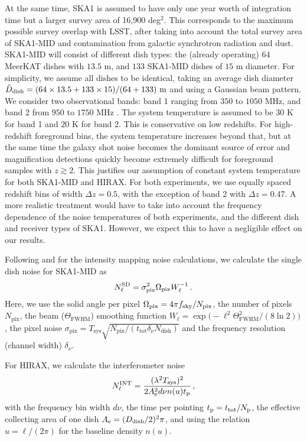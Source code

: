 \documentclass[useAMS,usenatbib]{mnras}
\begin{document}
At the same time, SKA1 is assumed to have only one year worth of integration time but a larger survey area of 16,900 deg${}^2$. This corresponds to the maximum possible survey overlap with LSST, after taking into account the total survey area of SKA1-MID \citep{2015aska.confE..19S} and contamination from galactic synchrotron radiation and dust. SKA1-MID will consist of different dish types: the (already operating) 64 MeerKAT dishes with $13.5$ m, and $133$ SKA1-MID dishes of $15$ m diameter. For simplicity, we assume all dishes to be identical, taking an average dish diameter $\tilde{D}_\mathrm{dish} = (64 \times 13.5 + 133 \times 15)/(64+133){\rm~m}$ and using a Gaussian beam pattern. We consider two observational bands: band 1 ranging from $350$ to $1050$ MHz, and band 2 from $950$ to $1750$ MHz \citep{Bacon:2018dui}. The system temperature is assumed to be  $30$ K for band 1 and $20$ K for band 2. This is conservative on low redshifts. For high-redshift foreground bins, the system temperature increases beyond that, but at the same time the galaxy shot noise becomes the dominant source of error and magnification detections quickly become extremely difficult for foreground samples with $z \gtrsim 2$. This justifies our assumption of constant system temperature for both SKA1-MID and HIRAX. For both experiments, we use equally spaced redshift bins of width $\Delta z = 0.5$, with the exception of band 2 with $\Delta z = 0.47$. A more realistic treatment would have to take into account the frequency dependence of the noise temperatures of both experiments, and the different dish and receiver types of SKA1. However, we expect this to have a negligible effect on our results.


Following \cite{Battye:2012tg} and \cite{0004-637X-803-1-21} for the intensity mapping noise calculations, we calculate the single dish noise for SKA1-MID as
\begin{equation}
  N^{\rm SD}_\ell = \sigma_\mathrm{pix}^2\Omega_\mathrm{pix}W_\ell^{-1} \, .
\end{equation}
Here, we use the solid angle per pixel $\Omega_\mathrm{pix} = 4\pi f_{\rm sky}/N_\mathrm{pix}$, the number of pixels $N_\mathrm{pix}$, the beam ($\Theta_\mathrm{FWHM}$) smoothing function $W_\ell = \exp\bigl(-\ell^2 \Theta_\mathrm{FWHM}^2/(8\ln{2})\bigr)$, the pixel noise $\sigma_\mathrm{pix} = T_\mathrm{sys}  \sqrt{ N_\mathrm{pix} / ( t_\mathrm{tot} \delta_\nu N_\mathrm{dish})}$ and the frequency resolution (channel width) $\delta_\nu$.

For HIRAX, we calculate the interferometer noise
\begin{equation}
  N^{\rm INT}_\ell = \frac{(\lambda^2 T_{\rm sys})^2}{2 A_{\rm e}^2 d\nu n(u) t_{\rm p}} \, ,
\end{equation}
with the frequency bin width $d\nu$, the time per pointing $t_{\rm p} = t_{\rm tot} / N_{\rm p}$, the effective collecting area of one dish $A_{\rm e} = (D_{\rm dish}/2)^2 \pi$, and using the relation $u = \ell / (2 \pi)$ for the baseline density $n(u)$.
\end{document}
